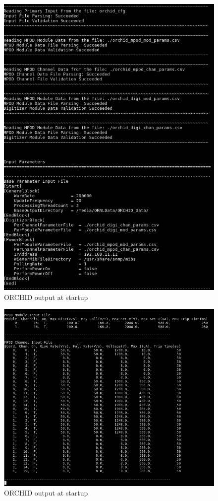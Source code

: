 \documentclass[onecolumn, 10pt, letterpaper, twoside]{article}
\begin{document}
\begin{figure}[h!]
\begin{center}
\includegraphics[width=\textwidth]{./Start_Screen_2.png}
\caption{ORCHID output at startup}
\label{fig:ORCHID_Startup2}
\end{center}
\end{figure}
\begin{figure}[h!]
\begin{center}
\includegraphics[width=\textwidth]{./Start_Screen_3.png}
\caption{ORCHID output at startup}
\label{fig:ORCHID_Startup3}
\end{center}
\end{figure}
\end{document}
